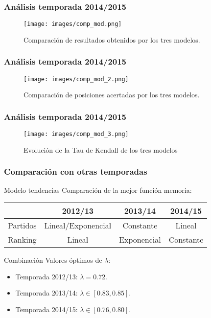 \documentclass{beamer}
\begin{document}
	\begin{frame}
		\frametitle{Análisis temporada 2014/2015}
			\begin{figure} 
				\centering
				\texttt{[image: images/comp\_mod.png]}
				\caption{Comparación de resultados obtenidos por los tres modelos.}
			\end{figure}
	\end{frame}	

	\begin{frame}
		\frametitle{Análisis temporada 2014/2015}
		\begin{figure} 
			\centering
			\texttt{[image: images/comp\_mod\_2.png]}
			\caption{Comparación de posiciones acertadas por los tres modelos.}
		\end{figure}
	\end{frame}	
	
	\begin{frame}
		\frametitle{Análisis temporada 2014/2015}
		\begin{figure} 
			\centering
			\texttt{[image: images/comp\_mod\_3.png]}
			\caption{Evolución de la Tau de Kendall de los tres modelos}
		\end{figure}
	\end{frame}	

	\begin{frame}
		\frametitle{Comparación con otras temporadas}
		\begin{block}{Modelo tendencias}
		Comparación de la mejor función memoria:
		\begin{center}
			\begin{tabular}{|c|c|c|c|}
				\hline &  2012/13 &  2013/14 &  2014/15 \\ 
				\hline Partidos & Lineal/Exponencial &  Constante &  Lineal \\ 
				\hline Ranking  &  Lineal &  Exponencial &  Constante \\ 
				\hline 
			\end{tabular} 
		\end{center}			
		\end{block}	
		\begin{block}{Combinación}
			Valores óptimos de $\lambda$:
			\begin{itemize}
				\item Temporada 2012/13: $\lambda=0.72$.
				\item Temporada 2013/14: $\lambda \in [0.83,0.85]$.
				\item Temporada 2014/15: $\lambda \in [0.76,0.80]$.
			\end{itemize}		
		\end{block}
	\end{frame}	
\end{document}
